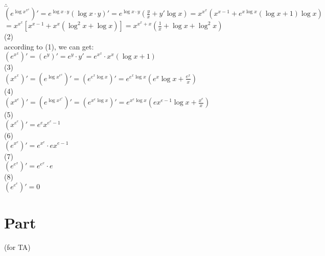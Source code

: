 \documentclass{article}
\begin{document}
$\therefore$\qquad$\left(e^{\log x^{x^x}}\right)'=e^{\log x\cdot y}(\log x\cdot y)'=e^{\log x\cdot y}\left(\displaystyle\frac{y}{x}+y'\log x\right)=x^{x^x}\left(x^{x-1}+e^{x\log x}(\log x+1)\log x\right)$\\

\qquad\qquad\qquad\qquad$=x^{x^x}\left[x^{x-1}+x^x(\log^2x+\log x)\right]=x^{x^x+x}\left(\displaystyle\frac{1}{x}+\log x+\log^2x\right)$\\

(2)\\

according to (1), we can get:\\

$\left(e^{x^x}\right)'=\left(e^y\right)'=e^y\cdot y'=e^{x^x}\cdot x^x(\log x+1)$\\

(3)\\

$\left(x^{e^x}\right)'=\left(e^{\log x^{e^x}}\right)'=\left(e^{e^x\log x}\right)'=e^{e^x\log x}\left(e^x\log x+\displaystyle\frac{e^x}{x}\right)$\\

(4)\\

$\left(x^{x^e}\right)'=\left(e^{\log x^{x^e}}\right)'=\left(e^{x^e\log x}\right)'=e^{x^e\log x}\left(ex^{e-1}\log x+\displaystyle\frac{x^e}{x}\right)$\\

(5)\\

$\left(x^{e^e}\right)'=e^ex^{e^e-1}$\\

(6)\\

$\left(e^{x^e}\right)'=e^{x^e}\cdot ex^{e-1}$\\

(7)\\

$\left(e^{e^x}\right)'=e^{e^x}\cdot e$\\

(8)\\

$\left(e^{e^e}\right)'=0$\\

\section{\textcolor[rgb]{0.70,0.00,0.00}{Part \uppercase\expandafter{}}}(for TA)
\end{document}
